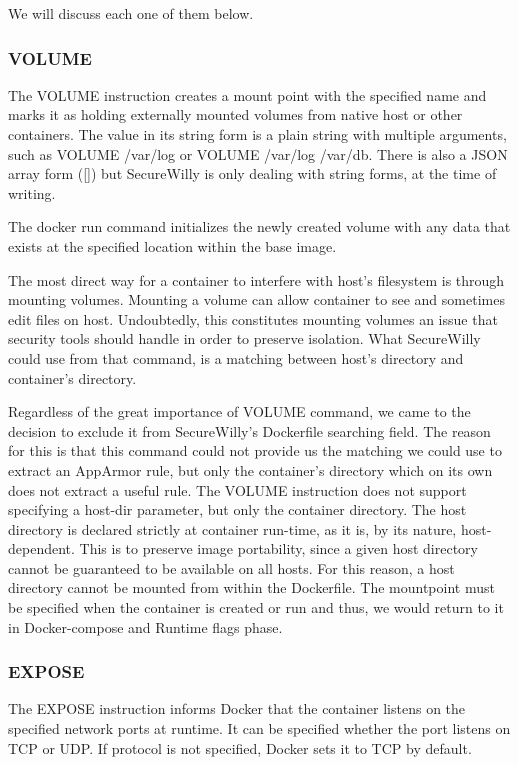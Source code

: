 We will discuss each one of them below.

\subsubsection{VOLUME}

The VOLUME instruction creates a mount point with the specified name and marks it as holding externally mounted volumes from native host or other containers. The value in its string form is a plain string with multiple arguments, such as VOLUME /var/log or VOLUME /var/log /var/db. There is also a JSON array form ([]) but SecureWilly is only dealing with string forms, at the time of writing.

The docker run command initializes the newly created volume with any data that exists at the specified location within the base image.

The most direct way for a container to interfere with host's filesystem is through mounting volumes. Mounting a volume can allow container to see and sometimes edit files on host. Undoubtedly, this constitutes mounting volumes an issue that security tools should handle in order to preserve isolation. What SecureWilly could use from that command, is a matching between host's directory and container's directory. 

Regardless of the great importance of VOLUME command, we came to the decision to exclude it from SecureWilly's Dockerfile searching field. The reason for this is that this command could not provide us the matching we could use to extract an AppArmor rule, but only the container's directory which on its own does not extract a useful rule. The VOLUME instruction does not support specifying a host-dir parameter, but only the container directory. The host directory is declared strictly at container run-time, as it is, by its nature, host-dependent. This is to preserve image portability, since a given host directory cannot be guaranteed to be available on all hosts. For this reason, a host directory cannot be mounted from within the Dockerfile.  The mountpoint must be specified when the container is created or run and thus, we would return to it in Docker-compose and Runtime flags phase.

\subsubsection{EXPOSE}
The EXPOSE instruction informs Docker that the container listens on the specified network ports at runtime. It can be specified whether the port listens on TCP or UDP. If protocol is not specified, Docker sets it to TCP by default.

